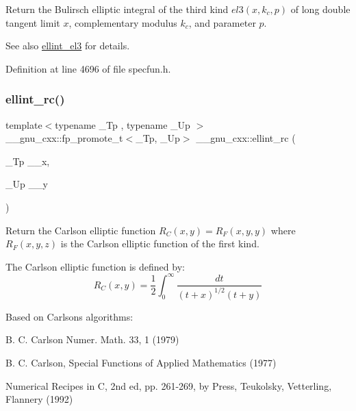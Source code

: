 Return the Bulirsch elliptic integral of the third kind $ el3(x,k_c,p) $ of {\ttfamily long double} tangent limit $ x $, complementary modulus $ k_c $, and parameter $ p $.

\begin{DoxySeeAlso}{See also}
\hyperlink{group__gnu__math__spec__func_gaac07922e08fdf46cd509ff0cfa9ea1f0}{ellint\+\_\+el3} for details. 
\end{DoxySeeAlso}


Definition at line 4696 of file specfun.\+h.

\mbox{\label{group__gnu__math__spec__func_ga7d3d42f5f71a74266be8aaca528056bf}} 
\subsubsection{\texorpdfstring{ellint\+\_\+rc()}{ellint\_rc()}}
{\footnotesize\ttfamily template$<$typename \+\_\+\+Tp , typename \+\_\+\+Up $>$ \\
\+\_\+\+\_\+gnu\+\_\+cxx\+::fp\+\_\+promote\+\_\+t$<$\+\_\+\+Tp, \+\_\+\+Up$>$ \+\_\+\+\_\+gnu\+\_\+cxx\+::ellint\+\_\+rc (\begin{DoxyParamCaption}\item[{\+\_\+\+Tp}]{\+\_\+\+\_\+x,  }\item[{\+\_\+\+Up}]{\+\_\+\+\_\+y }\end{DoxyParamCaption})\hspace{0.3cm}{\ttfamily [inline]}}

Return the Carlson elliptic function $ R_C(x,y) = R_F(x,y,y) $ where $ R_F(x,y,z) $ is the Carlson elliptic function of the first kind.

The Carlson elliptic function is defined by\+: \[ R_C(x,y) = \frac{1}{2} \int_0^\infty \frac{dt}{(t + x)^{1/2}(t + y)} \]

Based on Carlson\textquotesingle{}s algorithms\+:
\begin{DoxyItemize}
\item B. C. Carlson Numer. Math. 33, 1 (1979)
\item B. C. Carlson, Special Functions of Applied Mathematics (1977)
\item Numerical Recipes in C, 2nd ed, pp. 261-\/269, by Press, Teukolsky, Vetterling, Flannery (1992)
\end{DoxyItemize}


